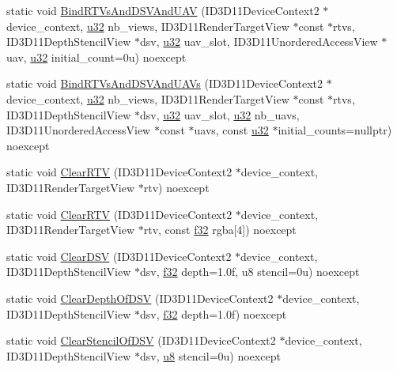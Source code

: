\begin{DoxyCompactItemize}
\item 
static void \hyperlink{structmage_1_1_pipeline_1_1_o_m_aa29f1743918f4be3dc7c22ef76954bc4}{Bind\+R\+T\+Vs\+And\+D\+S\+V\+And\+U\+AV} (I\+D3\+D11\+Device\+Context2 $\ast$device\+\_\+context, \hyperlink{namespacemage_af2b398bf98eb10351f49cad73fe2cc73}{u32} nb\+\_\+views, I\+D3\+D11\+Render\+Target\+View $\ast$const $\ast$rtvs, I\+D3\+D11\+Depth\+Stencil\+View $\ast$dsv, \hyperlink{namespacemage_af2b398bf98eb10351f49cad73fe2cc73}{u32} uav\+\_\+slot, I\+D3\+D11\+Unordered\+Access\+View $\ast$uav, \hyperlink{namespacemage_af2b398bf98eb10351f49cad73fe2cc73}{u32} initial\+\_\+count=0u) noexcept
\item 
static void \hyperlink{structmage_1_1_pipeline_1_1_o_m_a536d786376c774e2385558e9e586497d}{Bind\+R\+T\+Vs\+And\+D\+S\+V\+And\+U\+A\+Vs} (I\+D3\+D11\+Device\+Context2 $\ast$device\+\_\+context, \hyperlink{namespacemage_af2b398bf98eb10351f49cad73fe2cc73}{u32} nb\+\_\+views, I\+D3\+D11\+Render\+Target\+View $\ast$const $\ast$rtvs, I\+D3\+D11\+Depth\+Stencil\+View $\ast$dsv, \hyperlink{namespacemage_af2b398bf98eb10351f49cad73fe2cc73}{u32} uav\+\_\+slot, \hyperlink{namespacemage_af2b398bf98eb10351f49cad73fe2cc73}{u32} nb\+\_\+uavs, I\+D3\+D11\+Unordered\+Access\+View $\ast$const $\ast$uavs, const \hyperlink{namespacemage_af2b398bf98eb10351f49cad73fe2cc73}{u32} $\ast$initial\+\_\+counts=nullptr) noexcept
\item 
static void \hyperlink{structmage_1_1_pipeline_1_1_o_m_a0a40eb7a844d2861e74582879afec962}{Clear\+R\+TV} (I\+D3\+D11\+Device\+Context2 $\ast$device\+\_\+context, I\+D3\+D11\+Render\+Target\+View $\ast$rtv) noexcept
\item 
static void \hyperlink{structmage_1_1_pipeline_1_1_o_m_a6cb6b441bafb502889cfc09aca6c6e03}{Clear\+R\+TV} (I\+D3\+D11\+Device\+Context2 $\ast$device\+\_\+context, I\+D3\+D11\+Render\+Target\+View $\ast$rtv, const \hyperlink{namespacemage_a6a44ad388483959dc4dff9f2aef91431}{f32} rgba\mbox{[}4\mbox{]}) noexcept
\item 
static void \hyperlink{structmage_1_1_pipeline_1_1_o_m_a908c10af159007645e15df6264216c74}{Clear\+D\+SV} (I\+D3\+D11\+Device\+Context2 $\ast$device\+\_\+context, I\+D3\+D11\+Depth\+Stencil\+View $\ast$dsv, \hyperlink{namespacemage_a6a44ad388483959dc4dff9f2aef91431}{f32} depth=1.\+0f, u8 stencil=0u) noexcept
\item 
static void \hyperlink{structmage_1_1_pipeline_1_1_o_m_a741219a99680aec5adfa71deea327ef2}{Clear\+Depth\+Of\+D\+SV} (I\+D3\+D11\+Device\+Context2 $\ast$device\+\_\+context, I\+D3\+D11\+Depth\+Stencil\+View $\ast$dsv, \hyperlink{namespacemage_a6a44ad388483959dc4dff9f2aef91431}{f32} depth=1.\+0f) noexcept
\item 
static void \hyperlink{structmage_1_1_pipeline_1_1_o_m_a7abcae4f1726eccb04b4a140bdeda859}{Clear\+Stencil\+Of\+D\+SV} (I\+D3\+D11\+Device\+Context2 $\ast$device\+\_\+context, I\+D3\+D11\+Depth\+Stencil\+View $\ast$dsv, \hyperlink{namespacemage_a5a362e2d56fc439362a80516ecae7828}{u8} stencil=0u) noexcept
\end{DoxyCompactItemize}
